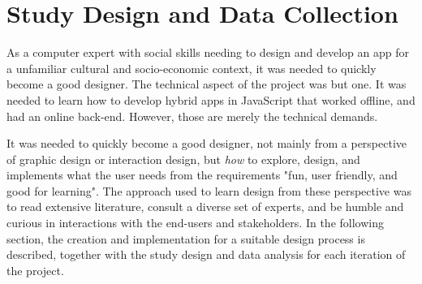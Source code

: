 \section{Study Design and Data Collection}

  As a computer expert with social skills needing to design and develop an app for a unfamiliar cultural and socio-economic context, it was needed to quickly become a good designer. The technical aspect of the project was but one. It was needed to learn how to develop hybrid apps in JavaScript that worked offline, and had an online back-end. However, those are merely the technical demands.

  It was needed to quickly become a good designer, not mainly from a perspective of graphic design or interaction design, but \textit{how} to explore, design, and implements what the user needs from the requirements "fun, user friendly, and good for learning". The approach used to learn design from these perspective was to read extensive literature, consult a diverse set of experts, and be humble and curious in interactions with the end-users and stakeholders. In the following section, the creation and implementation for a suitable design process is described, together with the study design and data analysis for each iteration of the project.



%








